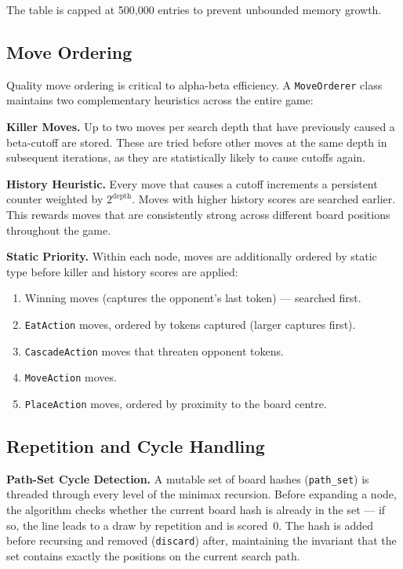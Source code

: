 \documentclass[10pt,a4paper]{article}
\begin{document}
The table is capped at 500,000 entries to prevent unbounded memory growth.

\subsection{Move Ordering}

Quality move ordering is critical to alpha-beta efficiency. A \texttt{MoveOrderer} class maintains two complementary heuristics across the entire game:

\textbf{Killer Moves.}
Up to two moves per search depth that have previously caused a beta-cutoff are stored. These are tried before other moves at the same depth in subsequent iterations, as they are statistically likely to cause cutoffs again.

\textbf{History Heuristic.}
Every move that causes a cutoff increments a persistent counter weighted by $2^{\text{depth}}$. Moves with higher history scores are searched earlier. This rewards moves that are consistently strong across different board positions throughout the game.

\textbf{Static Priority.}
Within each node, moves are additionally ordered by static type before killer and history scores are applied:

\begin{enumerate}[noitemsep]
    \item Winning moves (captures the opponent's last token) --- searched first.
    \item \texttt{EatAction} moves, ordered by tokens captured (larger captures first).
    \item \texttt{CascadeAction} moves that threaten opponent tokens.
    \item \texttt{MoveAction} moves.
    \item \texttt{PlaceAction} moves, ordered by proximity to the board centre.
\end{enumerate}

\subsection{Repetition and Cycle Handling}

\textbf{Path-Set Cycle Detection.}
A mutable set of board hashes (\texttt{path\_set}) is threaded through every level of the minimax recursion. Before expanding a node, the algorithm checks whether the current board hash is already in the set --- if so, the line leads to a draw by repetition and is scored~0. The hash is added before recursing and removed (\texttt{discard}) after, maintaining the invariant that the set contains exactly the positions on the current search path.
\end{document}
